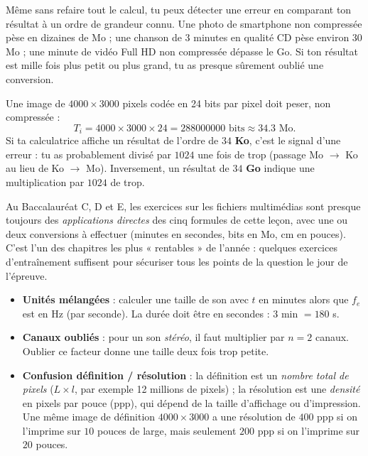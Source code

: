 \documentclass[11pt]{article}
\newcommand{\cle}[1]{{\popxbold\color{popdark}#1}}
\newcounter{popsec}
\newcounter{popsub}
\newcommand{\courssub}[1]{%
  \stepcounter{popsub}%
  \par\vspace{9pt}\noindent{\popxbold\fontsize{11.5}{13}\selectfont\color{popink}{\color{poporange}\thepopsec.\thepopsub}\hspace{6pt}#1}\par\nopagebreak\vspace{4pt}
}
\begin{document}
Même sans refaire tout le calcul, tu peux détecter une erreur en comparant ton résultat à un ordre de grandeur connu. Une photo de smartphone non compressée pèse en dizaines de Mo ; une chanson de 3 minutes en qualité CD pèse environ 30 Mo ; une minute de vidéo Full HD non compressée dépasse le Go. Si ton résultat est mille fois plus petit ou plus grand, tu as presque sûrement oublié une conversion.

\begin{exemplebox}
Une image de $4000 \times 3000$ pixels codée en 24 bits par pixel doit peser, non compressée :
\[ T_i = 4000 \times 3000 \times 24 = 288000000 \text{ bits} \approx \num{34,3} \text{ Mo}. \]
Si ta calculatrice affiche un résultat de l'ordre de $34$ \textbf{Ko}, c'est le signal d'une erreur : tu as probablement divisé par $1024$ une fois de trop (passage Mo $\rightarrow$ Ko au lieu de Ko $\rightarrow$ Mo). Inversement, un résultat de $34$ \textbf{Go} indique une multiplication par $1024$ de trop.
\end{exemplebox}

\begin{savaistu}
Au Baccalauréat C, D et E, les exercices sur les fichiers multimédias sont presque toujours des \emph{applications directes} des cinq formules de cette leçon, avec une ou deux conversions à effectuer (minutes en secondes, bits en Mo, cm en pouces). C'est l'un des chapitres les plus « rentables » de l'année : quelques exercices d'entraînement suffisent pour sécuriser tous les points de la question le jour de l'épreuve.
\end{savaistu}

\courssub{Erreurs classiques à éviter}

\begin{attention}
\begin{itemize}
  \item \textbf{Unités mélangées} : calculer une taille de son avec $t$ en minutes alors que $f_e$ est en Hz (par seconde). La durée doit être en secondes : $3$ min $= 180$ s.
  \item \textbf{Canaux oubliés} : pour un son \emph{stéréo}, il faut multiplier par $n = 2$ canaux. Oublier ce facteur donne une taille deux fois trop petite.
  \item \textbf{Confusion définition / résolution} : la \cle{définition} est un \emph{nombre total de pixels} ($L \times l$, par exemple 12 millions de pixels) ; la \cle{résolution} est une \emph{densité} en pixels par pouce (ppp), qui dépend de la taille d'affichage ou d'impression. Une même image de définition $4000 \times 3000$ a une résolution de $400$ ppp si on l'imprime sur $10$ pouces de large, mais seulement $200$ ppp si on l'imprime sur $20$ pouces.
\end{itemize}
\end{attention}
\end{document}
